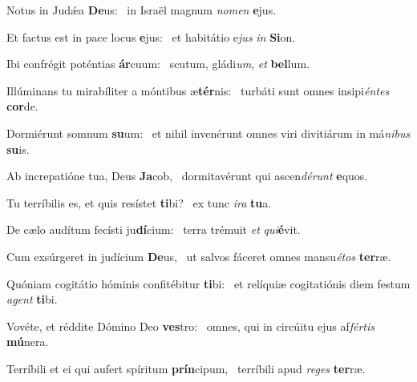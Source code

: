 \item Notus in Judǽa \textbf{De}us:~\psstar{} in Israël magnum \textit{nomen} \textbf{e}jus.
\item Et factus est in pace locus \textbf{e}jus:~\psstar{} et habitátio e\textit{jus} \textit{in} \textbf{Si}on.
\item Ibi confrégit poténtias \textbf{ár}cuum:~\psstar{} scutum, gládi\textit{um}, \textit{et} \textbf{bel}lum.
\item Illúminans tu mirabíliter a móntibus æ\textbf{tér}nis:~\psstar{} turbáti sunt omnes insipi\textit{éntes} \textbf{cor}de.
\item Dormiérunt somnum \textbf{su}um:~\psstar{} et nihil invenérunt omnes viri divitiárum in má\textit{nibus} \textbf{su}is.
\item Ab increpatióne tua, Deus \textbf{Ja}cob,~\psstar{} dormitavérunt qui a\-scen\textit{dérunt} \textbf{e}quos.
\item Tu terríbilis es, et quis resístet \textbf{ti}bi?~\psstar{} ex tunc \textit{ira} \textbf{tu}a.
\item De cælo audítum fecísti ju\textbf{dí}cium:~\psstar{} terra trémuit \textit{et} \textit{qui}\textbf{é}vit.
\item Cum exsúrgeret in judícium \textbf{De}us,~\psstar{} ut salvos fáceret omnes mansu\textit{étos} \textbf{ter}ræ.
\item Quóniam cogitátio hóminis confitébitur \textbf{ti}bi:~\psstar{} et relíquiæ cogitatiónis diem festum \textit{agent} \textbf{ti}bi.
\item Vovéte, et réddite Dómino Deo \textbf{ves}tro:~\psstar{} omnes, qui in circúitu ejus af\textit{fértis} \textbf{mú}nera.
\item Terríbili et ei qui aufert spíritum \textbf{prín}cipum,~\psstar{} terríbili apud \textit{reges} \textbf{ter}ræ.
